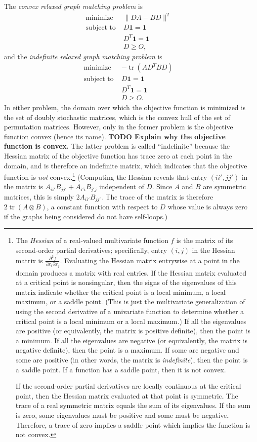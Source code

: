 \documentclass{article}
\newcommand{\todo}[1]{\textbf{TODO #1}}
\newcommand{\1}{\mathbf{1}}
\DeclareMathOperator{\tr}{tr}
\begin{document}
The \emph{convex relaxed graph matching problem} is
\begin{align*}
  \text{minimize } & \|DA - BD\|^2 \\
  \text{subject to } & D \1 = \1 \\
  & D^T \1 = \1 \\
  & D \geq O,
\end{align*}
and the \emph{indefinite relaxed graph matching problem} is
\begin{align*}
  \text{minimize } & -\tr(AD^TBD) \\
  \text{subject to } & D \1 = \1 \\
  & D^T \1 = \1 \\
  & D \geq O.
\end{align*}
In either problem, the domain over which the objective function is minimized is the set of doubly stochastic matrices, which is the convex hull of the set of permutation matrices.
However, only in the former problem is the objective function convex (hence its name).
\todo{Explain why the objective function is convex.}
The latter problem is called ``indefinite'' because the Hessian matrix of the objective function has trace zero at each point in the domain, and is therefore an indefinite matrix, which indicates that the objective function is \emph{not} convex.\footnote{%
  The \emph{Hessian} of a real-valued multivariate function $f$ is the matrix of its second-order partial derivatives; specifically, entry $(i, j)$ in the Hessian matrix is $\frac{\partial^2 f}{\partial x_i \partial x_j}$.
  Evaluating the Hessian matrix entrywise at a point in the domain produces a matrix with real entries.
  If the Hessian matrix evaluated at a critical point is nonsingular, then the signs of the eigenvalues of this matrix indicate whether the critical point is a local minimum, a local maximum, or a saddle point.
  (This is just the multivariate generalization of using the second derivative of a univariate function to determine whether a critical point is a local minimum or a local maximum.)
  If all the eigenvalues are positive (or equivalently, the matrix is positive definite), then the point is a minimum.
  If all the eigenvalues are negative (or equivalently, the matrix is negative definite), then the point is a maximum.
  If some are negative and some are positive (in other words, the matrix is \emph{indefinite}), then the point is a saddle point.
  If a function has a saddle point, then it is not convex.

  If the second-order partial derivatives are locally continuous at the critical point, then the Hessian matrix evaluated at that point is symmetric.
  The trace of a real symmetric matrix equals the sum of its eigenvalues.
  If the sum is zero, some eigenvalues must be positive and some must be negative.
  Therefore, a trace of zero implies a saddle point which implies the function is not convex.%
}
(Computing the Hessian reveals that entry $(ii', jj')$ in the matrix is $A_{ii'} B_{jj'} + A_{i'i} B_{j'j}$ independent of $D$.
Since $A$ and $B$ are symmetric matrices, this is simply $2 A_{ii'} B_{jj'}$.
The trace of the matrix is therefore $2 \tr(A \otimes B)$, a constant function with respect to $D$ whose value is always zero if the graphs being considered do not have self-loops.)
\end{document}
